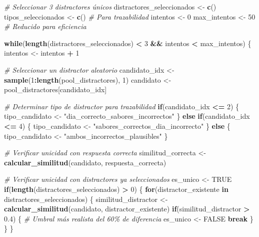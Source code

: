 \documentclass[
]{article}
\newenvironment{Shaded}{\begin{snugshade}}{\end{snugshade}}
\newcommand{\CommentTok}[1]{\textcolor[rgb]{0.56,0.35,0.01}{\textit{#1}}}
\newcommand{\ConstantTok}[1]{\textcolor[rgb]{0.56,0.35,0.01}{#1}}
\newcommand{\ControlFlowTok}[1]{\textcolor[rgb]{0.13,0.29,0.53}{\textbf{#1}}}
\newcommand{\DecValTok}[1]{\textcolor[rgb]{0.00,0.00,0.81}{#1}}
\newcommand{\FloatTok}[1]{\textcolor[rgb]{0.00,0.00,0.81}{#1}}
\newcommand{\FunctionTok}[1]{\textcolor[rgb]{0.13,0.29,0.53}{\textbf{#1}}}
\newcommand{\NormalTok}[1]{#1}
\newcommand{\OtherTok}[1]{\textcolor[rgb]{0.56,0.35,0.01}{#1}}
\newcommand{\SpecialCharTok}[1]{\textcolor[rgb]{0.81,0.36,0.00}{\textbf{#1}}}
\newcommand{\StringTok}[1]{\textcolor[rgb]{0.31,0.60,0.02}{#1}}
\begin{document}
\begin{Shaded}
\begin{Highlighting}[]
  \CommentTok{\# Seleccionar 3 distractores únicos}
\NormalTok{  distractores\_seleccionados }\OtherTok{\textless{}{-}} \FunctionTok{c}\NormalTok{()}
\NormalTok{  tipos\_seleccionados }\OtherTok{\textless{}{-}} \FunctionTok{c}\NormalTok{()  }\CommentTok{\# Para trazabilidad}
\NormalTok{  intentos }\OtherTok{\textless{}{-}} \DecValTok{0}
\NormalTok{  max\_intentos }\OtherTok{\textless{}{-}} \DecValTok{50}  \CommentTok{\# Reducido para eficiencia}

  \ControlFlowTok{while}\NormalTok{(}\FunctionTok{length}\NormalTok{(distractores\_seleccionados) }\SpecialCharTok{\textless{}} \DecValTok{3} \SpecialCharTok{\&\&}\NormalTok{ intentos }\SpecialCharTok{\textless{}}\NormalTok{ max\_intentos) \{}
\NormalTok{    intentos }\OtherTok{\textless{}{-}}\NormalTok{ intentos }\SpecialCharTok{+} \DecValTok{1}

    \CommentTok{\# Seleccionar un distractor aleatorio}
\NormalTok{    candidato\_idx }\OtherTok{\textless{}{-}} \FunctionTok{sample}\NormalTok{(}\DecValTok{1}\SpecialCharTok{:}\FunctionTok{length}\NormalTok{(pool\_distractores), }\DecValTok{1}\NormalTok{)}
\NormalTok{    candidato }\OtherTok{\textless{}{-}}\NormalTok{ pool\_distractores[candidato\_idx]}

    \CommentTok{\# Determinar tipo de distractor para trazabilidad}
    \ControlFlowTok{if}\NormalTok{(candidato\_idx }\SpecialCharTok{\textless{}=} \DecValTok{2}\NormalTok{) \{}
\NormalTok{      tipo\_candidato }\OtherTok{\textless{}{-}} \StringTok{"dia\_correcto\_sabores\_incorrectos"}
\NormalTok{    \} }\ControlFlowTok{else} \ControlFlowTok{if}\NormalTok{(candidato\_idx }\SpecialCharTok{\textless{}=} \DecValTok{4}\NormalTok{) \{}
\NormalTok{      tipo\_candidato }\OtherTok{\textless{}{-}} \StringTok{"sabores\_correctos\_dia\_incorrecto"}
\NormalTok{    \} }\ControlFlowTok{else}\NormalTok{ \{}
\NormalTok{      tipo\_candidato }\OtherTok{\textless{}{-}} \StringTok{"ambos\_incorrectos\_plausibles"}
\NormalTok{    \}}

    \CommentTok{\# Verificar unicidad con respuesta correcta}
\NormalTok{    similitud\_correcta }\OtherTok{\textless{}{-}} \FunctionTok{calcular\_similitud}\NormalTok{(candidato, respuesta\_correcta)}

    \CommentTok{\# Verificar unicidad con distractores ya seleccionados}
\NormalTok{    es\_unico }\OtherTok{\textless{}{-}} \ConstantTok{TRUE}
    \ControlFlowTok{if}\NormalTok{(}\FunctionTok{length}\NormalTok{(distractores\_seleccionados) }\SpecialCharTok{\textgreater{}} \DecValTok{0}\NormalTok{) \{}
      \ControlFlowTok{for}\NormalTok{(distractor\_existente }\ControlFlowTok{in}\NormalTok{ distractores\_seleccionados) \{}
\NormalTok{        similitud\_distractor }\OtherTok{\textless{}{-}} \FunctionTok{calcular\_similitud}\NormalTok{(candidato, distractor\_existente)}
        \ControlFlowTok{if}\NormalTok{(similitud\_distractor }\SpecialCharTok{\textgreater{}} \FloatTok{0.4}\NormalTok{) \{  }\CommentTok{\# Umbral más realista del 60\% de diferencia}
\NormalTok{          es\_unico }\OtherTok{\textless{}{-}} \ConstantTok{FALSE}
          \ControlFlowTok{break}
\NormalTok{        \}}
\NormalTok{      \}}
\NormalTok{    \}}


\end{Highlighting}
\end{Shaded}
\end{document}
